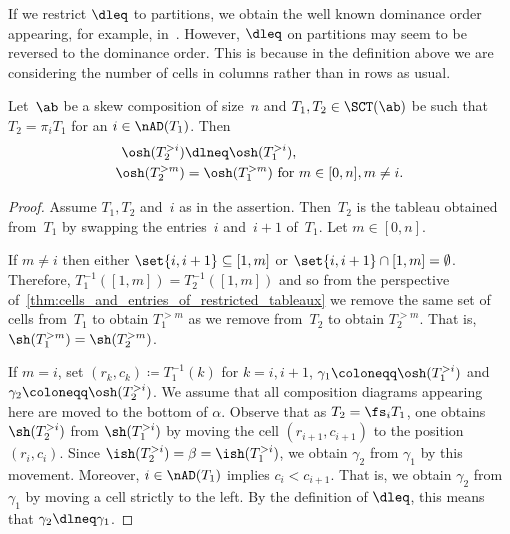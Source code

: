 	If we restrict $\dleq$ to partitions, we obtain the well known dominance order appearing, for example, in~\cite{Stanley1999}. However, $\dleq$ on partitions may seem to be reversed to the dominance order. This is because in the definition above we are considering the number of cells in columns rather than in rows as usual.







\begin{lemma}
		\label{thm:dominance_and_hecke_covering}
	Let~$\ab$ be a skew composition of size~$n$ and $T_1,T_2\in \SCT(\ab)$ be such that $T_2 = \pi_i T_1$ for an $i\in \nAD(T_1)$.
	 Then
	\begin{alignat*}{32}
		\osh(T_2^{>i}) &\dlneq \osh (T_1^{>i}), \\
		\osh(T_2^{>m}) &= \osh (T_1^{>m}) \text{ for } m \in [0,n], m\neq i.
	\end{alignat*}
\end{lemma}

\begin{proof}
	Assume $T_1,T_2$ and~$i$ as in the assertion. Then~$T_2$ is the tableau obtained from~$T_1$ by swapping the entries~$i$ and~$i+1$ of~$T_1$. Let $m\in[0,n]$.
	 
	If $m\neq i$ then either $\set{i,i+1} \subseteq [1,m]$ or $\set{i,i+1} \cap [1,m]= \emptyset$.
	Therefore, $T_1^{-1}([1,m]) = T_2^{-1} ([1,m])$ and so from the perspective of~\cref{thm:cells_and_entries_of_restricted_tableaux} we remove the same set of cells from~$T_1$ to obtain $T_1^{>m}$ as we remove from~$T_2$ to obtain $T_2^{>m}$. That is,	$\sh(T^{>m}_1) = \sh(T^{>m}_2)$.
	
	If $m = i$, set $(r_k,c_k) \coloneqq T_1^{-1}(k)$ for $k= i,i+1$, $\gamma_1 \coloneqq \osh(T^{>i}_1)$ and $\gamma_2 \coloneqq \osh(T^{>i}_2)$. 
	We assume that all composition diagrams appearing here are moved to the bottom of $\alpha$.
	Observe that as $T_2 = \fs_i T_1$, one obtains $\sh(T^{>i}_2)$ from $\sh(T^{>i}_1)$ by moving the cell $(r_{i+1}, c_{i+1})$ to the position $(r_i,c_i)$. Since $\ish(T^{>i}_2) = \beta = \ish(T^{>i}_1)$, we obtain $\gamma_2$ from $\gamma_1$ by this movement.
	 Moreover, $i\in \nAD(T_1)$ implies $c_i < c_{i+1}$. That is, we obtain $\gamma_2$ from $\gamma_1$ by moving a cell strictly to the left. By the definition of $\dleq$, this means that $\gamma_2 \dlneq \gamma_1$.
\end{proof}

